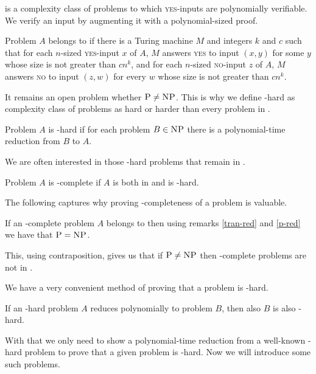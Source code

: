 \np is a complexity class of problems to which \textsc{yes}-inputs are polynomially verifiable.
We verify an input by augmenting it with a polynomial-sized proof.

\begin{defn}[\np]
Problem $A$ belongs to \np if there is a Turing machine $M$ and integers $k$ and $c$ such that
for each $n$-sized \textsc{yes}-input $x$ of $A$,
$M$ answers \textsc{yes} to input $(x,y)$ for some $y$ whose size is not greater than $c n^k$,
and for each $n$-sized \textsc{no}-input $z$ of $A$,
$M$ answers \textsc{no} to input $(z,w)$ for every $w$ whose size is not greater than $c n^k$.
\end{defn}

It remains an open problem whether $\text{\textsc{P}}\neq\text{\textsc{NP}}$.
This is why we define \np-hard as complexity class of problems as hard or harder than every problem in \np.

\begin{defn}[\np-hard]
Problem $A$ is \np-hard if for each problem $B \in \text{\textsc{NP}}$
there is a polynomial-time reduction from $B$ to $A$.
\end{defn}

We are often interested in those \np-hard problems that remain in \np.

\begin{defn}[\np-complete]
Problem $A$ is \np-complete if $A$ is both in \np and is \np-hard.
\end{defn}

The following captures why proving \np-completeness of a problem is valuable.

\begin{rmrk}
If an \np-complete problem $A$ belongs to \p then using remarks \ref{tran-red} and \ref{p-red}
we have that $\text{\textsc{P}} = \text{\textsc{NP}}$.
\end{rmrk}

This, using contraposition, gives us that if $\text{\textsc{P}} \neq \text{\textsc{NP}}$ then \np-complete problems are not in \p.

We have a very convenient method of proving that a problem is \np-hard.

\begin{rmrk}
If an \np-hard problem $A$ reduces polynomially to problem $B$, then also $B$ is also \np-hard.
\end{rmrk}

With that we only need to show a polynomial-time reduction from a well-known \np-hard problem
to prove that a given problem is \np-hard.
Now we will introduce some such problems.

